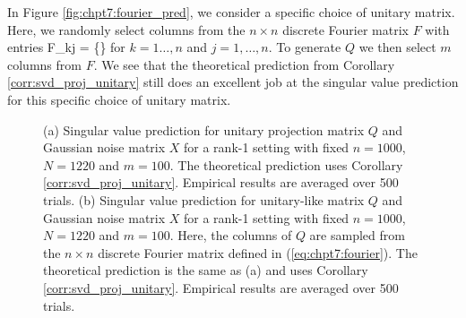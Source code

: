 In Figure \ref{fig:chpt7:fourier_pred}, we consider a specific choice of unitary
matrix. Here, we randomly select columns from the $n\times n$ discrete Fourier matrix $F$
with entries  
\beq\label{eq:chpt7:fourier}
F_{kj} = \exp\left\{\right\}
\eeq
for $k=1\dots,n$ and $j=1,\dots,n$. To generate $Q$ we then select $m$ columns from
$F$. We see that the theoretical prediction from Corollary \ref{corr:svd_proj_unitary}
still does an excellent job at the singular value prediction for this specific choice of
unitary matrix. 

\begin{figure}
  \begin{center}
    \caption{(a) Singular value prediction for unitary projection matrix $Q$ and Gaussian
      noise matrix $X$ for a rank-1 setting with fixed $n=1000$, $N=1220$ and $m=100$. The
      theoretical prediction uses Corollary \ref{corr:svd_proj_unitary}. Empirical results
      are averaged over 500 trials. (b) Singular value prediction for unitary-like matrix
      $Q$ and Gaussian noise matrix $X$ for a rank-1 setting with fixed $n=1000$, $N=1220$
      and $m=100$. Here, the columns of $Q$ are sampled from the $n\times n$ discrete
      Fourier matrix defined in (\ref{eq:chpt7:fourier}). The theoretical prediction is
      the same as (a) and uses Corollary \ref{corr:svd_proj_unitary}. Empirical results
      are averaged over 500 trials.}
    \label{fig:chpt7:ortho_sv}
  \end{center}
\end{figure}

